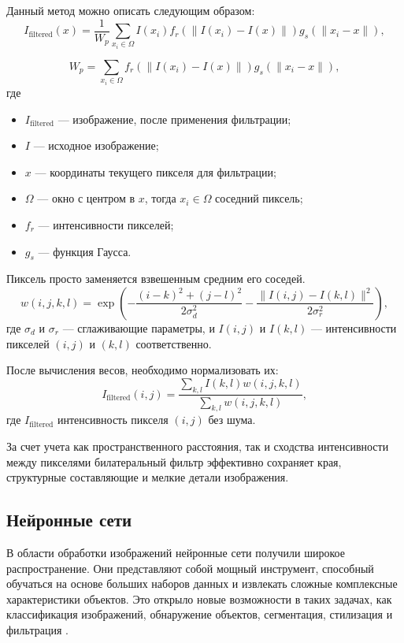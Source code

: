 Данный метод можно описать следующим образом:
\begin{equation}
	I_\text{filtered}(x) = \frac{1}{W_p} \sum_{x_i \in \Omega} I(x_i)f_r(\|I(x_i) - I(x)\|)g_s(\|x_i - x\|),
\end{equation}

\noindent
\begin{equation}
	W_p = \sum_{x_i \in \Omega}{f_r(\|I(x_i) - I(x)\|)g_s(\|x_i - x\|)},
\end{equation}
где
\begin{itemize}
	\item $I_\text{filtered}$ --- изображение, после применения фильтрации;
	\item $I$ --- исходное изображение;
	\item $x$ --- координаты текущего пикселя для фильтрации;
	\item $\Omega$ --- окно с центром в $x$, тогда $x_i \in \Omega$ соседний пиксель;
	\item $f_r$ --- интенсивности пикселей;
	\item $g_s$ --- функция Гаусса.
\end{itemize}

Пиксель просто заменяется взвешенным средним его соседей.
\noindent
\begin{equation}
	w(i, j, k, l) = \exp\left(-\frac{(i - k)^2 + (j - l)^2}{2 \sigma_d^2} - \frac{\|I(i, j) - I(k, l)\|^2}{2 \sigma_r^2}\right),
\end{equation}
где $\sigma_d$ и $\sigma_r$ --- сглаживающие параметры, и $I(i, j)$ и $I(k, l)$ --- интенсивности пикселей $(i, j)$ и $ (k, l)$ соответственно.

После вычисления весов, необходимо нормализовать их:
\begin{equation}
	I_\text{filtered}(i, j) = \frac{\sum_{k, l} I(k, l) w(i, j, k, l)}{\sum_{k, l} w(i, j, k, l)},
\end{equation}
где $I_\text{filtered}$ интенсивность пикселя $(i, j)$ без шума.

За счет учета как пространственного расстояния, так и сходства интенсивности между пикселями билатеральный фильтр эффективно сохраняет края, структурные составляющие и мелкие детали изображения.  

\subsection{Нейронные сети}

В области обработки изображений нейронные сети получили широкое распространение. Они представляют собой мощный инструмент, способный обучаться на основе больших наборов данных и извлекать сложные комплексные характеристики объектов. Это открыло новые возможности в таких задачах, как классификация изображений, обнаружение объектов, сегментация, стилизация и фильтрация \cite{generalimageprocessing}.

